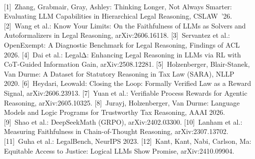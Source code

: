 \documentclass[10pt,a4paper]{article}
\begin{document}
\vspace{0pt}{\color{accent}\rule{\linewidth}{0.3pt}}\\[-1.5pt]
{\fontsize{6.8}{7.7}\selectfont\color{muted}
[1]~Zhang, Grabmair, Gray, Ashley: Thinking Longer, Not Always Smarter: Evaluating LLM Capabilities in Hierarchical Legal Reasoning, CSLAW~'26.
[2]~Wang et al.: Know Your Limits: On the Faithfulness of LLMs as Solvers and Autoformalizers in Legal Reasoning, arXiv:2606.16118.
[3]~Servantez et al.: OpenExempt: A Diagnostic Benchmark for Legal Reasoning, Findings of ACL 2026.
[4]~Dai et al.: LegalΔ: Enhancing Legal Reasoning in LLMs via RL with CoT-Guided Information Gain, arXiv:2508.12281.
[5]~Holzenberger, Blair-Stanek, Van Durme: A Dataset for Statutory Reasoning in Tax Law (SARA), NLLP 2020.
[6]~Heydari, Leowald: Closing the Loop: Formally Verified Law as a Reward Signal, arXiv:2606.23913.
[7]~Yuan et al.: Verifiable Process Rewards for Agentic Reasoning, arXiv:2605.10325.
[8]~Jurayj, Holzenberger, Van Durme: Language Models and Logic Programs for Trustworthy Tax Reasoning, AAAI 2026.
[9]~Shao et al.: DeepSeekMath (GRPO), arXiv:2402.03300.
[10]~Lanham et al.: Measuring Faithfulness in Chain-of-Thought Reasoning, arXiv:2307.13702.
[11]~Guha et al.: LegalBench, NeurIPS 2023.
[12]~Kant, Kant, Nabi, Carlson, Ma: Equitable Access to Justice: Logical LLMs Show Promise, arXiv:2410.09904.\par}
\end{document}
